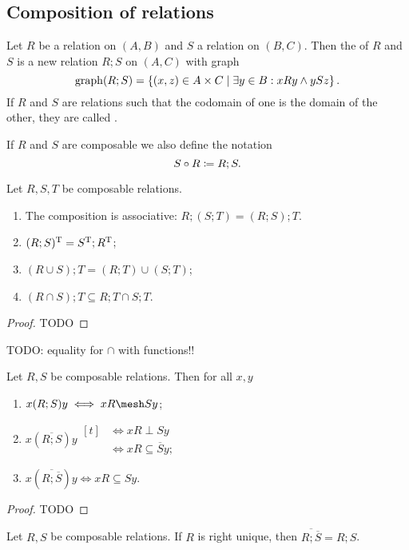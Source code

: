 \subsection{Composition of relations}
\begin{definition}
Let $R$ be a relation on $(A, B)$ and $S$ a relation on $(B, C)$. Then the  of $R$ and $S$ is a new relation $R;S$ on $(A, C)$ with graph
\[ \operatorname{graph}(R;S) = \left\{ (x,z)\in A\times C \;\middle|\; \exists y\in B: xRy \land ySz \right\}. \]
If $R$ and $S$ are relations such that the codomain of one is the domain of the other, they are called .

If $R$ and $S$ are composable we also define the notation
\[ S\circ R \coloneqq R;S. \]
\end{definition}
\begin{lemma} \label{relationalComposition}
Let $R,S,T$ be composable relations.
\begin{enumerate}
\item The composition is associative: $R;(S;T) = (R;S);T$.
\item $(R;S)^{\mathrm{T}} = S^{\mathrm{T}} ; R^{\mathrm{T}}$;
\item $(R\cup S);T = (R;T) \cup (S;T)$;
\item $(R\cap S);T \subseteq R;T \cap S;T$.
\end{enumerate}
\end{lemma}
\begin{proof}
TODO
\end{proof}
TODO: equality for $\cap$ with functions!!

\begin{lemma} \label{setOfRelationComposition}
Let $R,S$ be composable relations. Then for all $x,y$
\begin{enumerate}
\item $x(R;S)y \iff xR \mesh Sy$;
\item $x(\overline{R;S})y \begin{aligned}[t]
&\iff xR\perp Sy \\
&\iff xR \subseteq \overline{S}y;
\end{aligned}$
\item $x(\overline{R;\overline{S}})y \iff xR \subseteq Sy$.
\end{enumerate}
\end{lemma}
\begin{proof}
TODO
\end{proof}
\begin{corollary}
Let $R,S$ be composable relations. If $R$ is right unique, then $\overline{R;\overline{S}} = R;S$.
\end{corollary}


